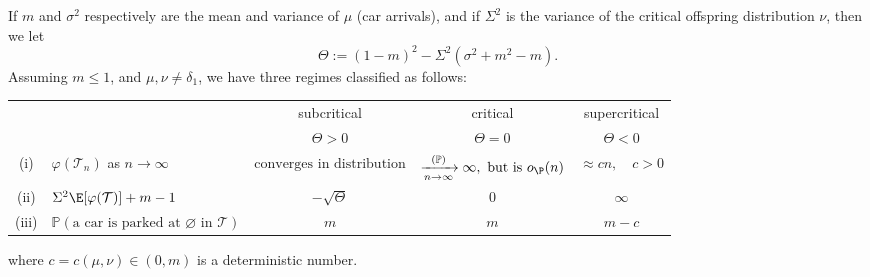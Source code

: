  \begin{theorem} \label{thm:main} If $m$ and $\sigma^{2}$ respectively are the mean and variance of $\mu$ (car arrivals),  and if  $\Sigma^{2}$ is the variance of the critical offspring distribution $\nu$, then we let $$\Theta:=(1-m)^2- \Sigma^2 (\sigma^2 +m^2-m).$$
Assuming $m \leq 1$, and $\mu, \nu \neq \delta_1$, we have three regimes classified as follows:
 \begin{center}
 \begin{tabular}{|c||l|c|c|c|}
 \hline
&  & subcritical  
& critical
  & supercritical \\
& & $ \Theta>0$ 
& $ \Theta=0 $ 
& $ \Theta<0 $\\
  \hline\hline
(i) &  $ \varphi( \mathcal{T}_{n})$ as $n \to \infty$ & $\mbox{converges in distribution}$  
& $ \xrightarrow[n\to\infty]{ (\mathbb{P})}\infty, \mbox{ but is }o_{\P}(n)$ 
& $ \approx cn, \quad c>0$\\
\hline \hline
 (ii) &$ \Sigma^2 \E[\varphi (\mathcal{T})] + m-1$& $- \sqrt{\Theta}$ 
 & $0$ 
 & $\infty$\\
  \hline  
      \hline
(iii)  &$ \mathbb{P}( \mbox{a car is parked at } {\varnothing} \mbox{ in } \mathcal{T})$ & $m$ 
& $m$ 
& $m-c$  \\
\hline
\hline
 \end{tabular}
 \end{center}
where $c = c (\mu,\nu) \in (0,m)$ is a deterministic number.
 \end{theorem}
 \medskip 




